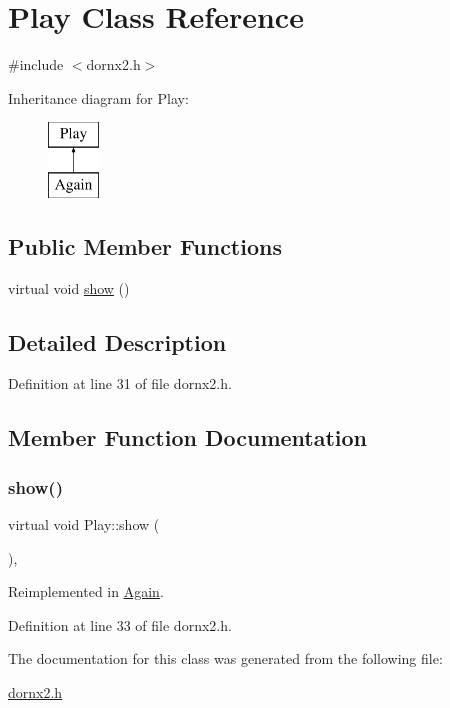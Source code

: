 \hypertarget{class_play}{}\section{Play Class Reference}
\label{class_play}


{\ttfamily \#include $<$dornx2.\+h$>$}

Inheritance diagram for Play\+:\begin{figure}[H]
\begin{center}
\leavevmode
\includegraphics[height=2.000000cm]{class_play}
\end{center}
\end{figure}
\subsection*{Public Member Functions}
\begin{DoxyCompactItemize}
\item 
virtual void \hyperlink{class_play_a87bb5456a9fcecfb9075b73db83d1e4c}{show} ()
\end{DoxyCompactItemize}


\subsection{Detailed Description}


Definition at line 31 of file dornx2.\+h.



\subsection{Member Function Documentation}
\mbox{\label{class_play_a87bb5456a9fcecfb9075b73db83d1e4c}} 
\subsubsection{\texorpdfstring{show()}{show()}}
{\footnotesize\ttfamily virtual void Play\+::show (\begin{DoxyParamCaption}{ }\end{DoxyParamCaption})\hspace{0.3cm}{\ttfamily [inline]}, {\ttfamily [virtual]}}



Reimplemented in \hyperlink{class_again_af3e99a5b59be21b644823ce7a9837a8f}{Again}.



Definition at line 33 of file dornx2.\+h.



The documentation for this class was generated from the following file\+:\begin{DoxyCompactItemize}
\item 
\hyperlink{dornx2_8h}{dornx2.\+h}\end{DoxyCompactItemize}
